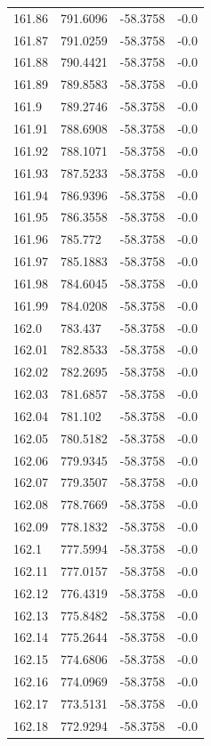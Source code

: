 \begin{table}[H]
\begin{tabular}{llll}
161.86 & 791.6096 & -58.3758 & -0.0 \\
161.87 & 791.0259 & -58.3758 & -0.0 \\
161.88 & 790.4421 & -58.3758 & -0.0 \\
161.89 & 789.8583 & -58.3758 & -0.0 \\
161.9 & 789.2746 & -58.3758 & -0.0 \\
161.91 & 788.6908 & -58.3758 & -0.0 \\
161.92 & 788.1071 & -58.3758 & -0.0 \\
161.93 & 787.5233 & -58.3758 & -0.0 \\
161.94 & 786.9396 & -58.3758 & -0.0 \\
161.95 & 786.3558 & -58.3758 & -0.0 \\
161.96 & 785.772 & -58.3758 & -0.0 \\
161.97 & 785.1883 & -58.3758 & -0.0 \\
161.98 & 784.6045 & -58.3758 & -0.0 \\
161.99 & 784.0208 & -58.3758 & -0.0 \\
162.0 & 783.437 & -58.3758 & -0.0 \\
162.01 & 782.8533 & -58.3758 & -0.0 \\
162.02 & 782.2695 & -58.3758 & -0.0 \\
162.03 & 781.6857 & -58.3758 & -0.0 \\
162.04 & 781.102 & -58.3758 & -0.0 \\
162.05 & 780.5182 & -58.3758 & -0.0 \\
162.06 & 779.9345 & -58.3758 & -0.0 \\
162.07 & 779.3507 & -58.3758 & -0.0 \\
162.08 & 778.7669 & -58.3758 & -0.0 \\
162.09 & 778.1832 & -58.3758 & -0.0 \\
162.1 & 777.5994 & -58.3758 & -0.0 \\
162.11 & 777.0157 & -58.3758 & -0.0 \\
162.12 & 776.4319 & -58.3758 & -0.0 \\
162.13 & 775.8482 & -58.3758 & -0.0 \\
162.14 & 775.2644 & -58.3758 & -0.0 \\
162.15 & 774.6806 & -58.3758 & -0.0 \\
162.16 & 774.0969 & -58.3758 & -0.0 \\
162.17 & 773.5131 & -58.3758 & -0.0 \\
162.18 & 772.9294 & -58.3758 & -0.0 \\

\end{tabular}
\end{table}
